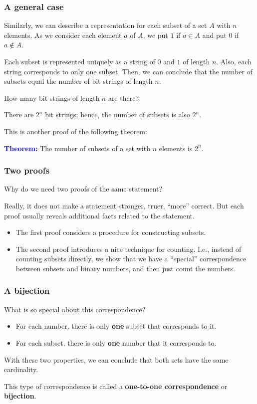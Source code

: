 \begin{frame}\frametitle{A general case}
  Similarly, we can describe a representation for each subset of a set
  $A$ with $n$ elements.  As we consider each element $a$ of $A$, we
  put $1$ if $a\in A$ and put $0$ if $a\not\in A$.
  \pause

  Each subset is represented uniquely as a string of $0$ and $1$ of
  length $n$.  Also, each string corresponds to only one subset.
  Then, we can conclude that the number of subsets equal the number of
  bit strings of length $n$.
  \pause

  How many bit strings of length $n$ are there?
  \pause

  \vspace{0.1in}

  There are $2^n$ bit strings; hence, the number of subsets is also
  $2^n$.
  \pause
  
  This is another proof of the following theorem:
  
  \begin{tcolorbox}
    {\bf \textcolor{blue}{Theorem:}} The number of subsets of a set with
    $n$ elements is $2^n$.
  \end{tcolorbox}
\end{frame}

\begin{frame}\frametitle{Two proofs}
  Why do we need two proofs of the same statement?
  \pause

  Really, it does not make a statement stronger, truer, ``more''
  correct.  But each proof usually reveals additional facts related to
  the statement.

  \begin{itemize}
  \item The first proof considers a procedure for constructing subsets.
  \item The second proof introduces a nice technique for counting.
    I.e., instead of counting subsets directly, we show that we have a
    ``special'' correspondence between subsets and binary numbers, and
    then just count the numbers.
  \end{itemize}
\end{frame}

\begin{frame}\frametitle{A bijection}
  What is so special about this correspondence?
  \pause

  \begin{itemize}
  \item For each number, there is only {\bf one} subset that
    corresponds to it.
  \item For each subset, there is only {\bf one} number that it
    corresponds to.
  \end{itemize}

  With these two properties, we can conclude that both sets have the
  same cardinality.

  \begin{tcolorbox}
    This type of correspondence is called a {\bf
      one-to-one correspondence} or {\bf bijection}.
  \end{tcolorbox}
\end{frame}


